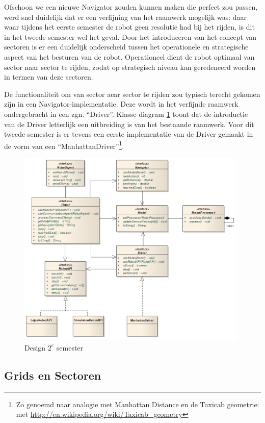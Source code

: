 \documentclass[12pt,a4paper]{report}
\begin{document}
Ofschoon we een nieuwe Navigator zouden kunnen maken die perfect zou passen, werd snel duidelijk dat er een verfijning van het raamwerk mogelijk was: daar waar tijdens het eerste semester de robot geen resolutie had bij het rijden, is dit in het tweede semester wel het geval. Door het introduceren van het concept van sectoren is er een duidelijk onderscheid tussen het operationele en strategische aspect van het besturen van de robot. Operationeel dient de robot optimaal van sector naar sector te rijden, zodat op strategisch niveau kan geredeneerd worden in termen van deze sectoren.

De functionaliteit om van sector aear sector te rijden zou typisch terecht gekomen zijn in een Navigator-implementatie. Deze wordt in het verfijnde raamwerk ondergebracht in een zgn. ``Driver''. Klasse diagram \ref{uml:design-semster2} toont dat de introductie van de Driver letterlijk een uitbreiding is van het bestaande raamwerk. Voor dit tweede semester is er tevens een eerste implementatie van de Driver gemaakt in de vorm van een ``ManhattanDriver''\footnote{Zo genoemd naar analogie met Manhattan Distance en de Taxicab geometrie: met \url{http://en.wikipedia.org/wiki/Taxicab_geometry}}. 

\begin{figure}[htbp]
  \centering
  \includegraphics[width=110mm]{resources/design-semester2.png}
  \caption{Design $2^e$ semester}
  \label{uml:design-semster2}
\end{figure}

\subsection{Grids en Sectoren}
\end{document}
